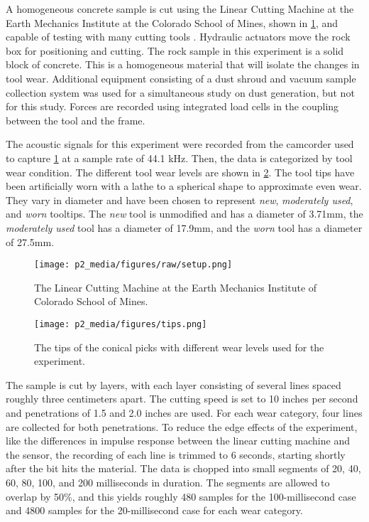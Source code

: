 A homogeneous concrete sample is cut using the Linear Cutting Machine
at the Earth Mechanics Institute at the Colorado School of Mines, shown in \ref{fig:setup},
and capable of testing with many cutting tools \cite{THYAGARAJAN2024105675}. 
Hydraulic actuators move the rock box for positioning and cutting. The rock sample in this experiment
is a solid block of concrete. This is a homogeneous material that will isolate the changes in tool wear.
Additional equipment consisting of a dust shroud and vacuum sample collection system was used for a
 simultaneous study on dust generation, but not for this study.
Forces are recorded using integrated load cells in the coupling between the tool and the frame.

The acoustic signals for this experiment were recorded from the camcorder 
used to capture \ref{fig:setup} at a sample rate of 44.1 kHz.
Then, the data is categorized by tool wear condition.
The different tool wear levels are shown in \ref{fig:levels}.
The tool tips have been artificially worn with a lathe to a spherical shape to approximate even wear.
They vary in diameter and have been chosen to represent 
\textit{new}, \textit{moderately used}, and \textit{worn} tooltips.
The \textit{new} tool is unmodified and has a diameter of 3.71mm, 
the \textit{moderately used} tool has a diameter of 17.9mm,
 and the \textit{worn} tool has a diameter of 27.5mm.

\begin{figure}[t!]
\centering
\texttt{[image: p2\_media/figures/raw/setup.png]}
\caption{The Linear Cutting Machine at the Earth Mechanics Institute of Colorado School of Mines.
}
\label{fig:setup}
\end{figure}

\begin{figure}[t!]
\centering
\texttt{[image: p2\_media/figures/tips.png]}
\caption{The tips of the conical picks with different wear levels used for the experiment.
}
\label{fig:levels}
\end{figure}

The sample is cut by layers, with each layer consisting of several lines spaced roughly three centimeters apart. 
The cutting speed is set to 10 inches per second and penetrations of 1.5 and 2.0 inches are used. 
For each wear category, four lines are collected for both penetrations. 
To reduce the edge effects of the experiment, like the differences in impulse response between 
the linear cutting machine and the sensor, the recording of each line is trimmed to 6 seconds, 
starting shortly after the bit hits the material. The data is chopped into small segments of 
20, 40, 60, 80, 100, and 200 milliseconds in duration. The segments are allowed to overlap by 50\%, 
and this yields roughly 480 samples for the 100-millisecond case and 4800 samples for the 
20-millisecond case for each wear category.

